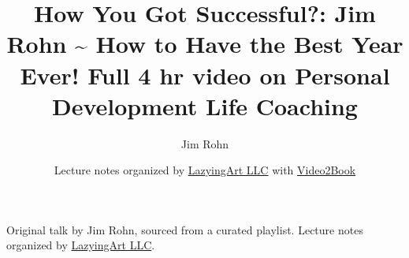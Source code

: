 \documentclass[11pt,oneside]{book}
\begin{document}
\frontmatter
\title{How You Got Successful?: Jim Rohn \textasciitilde{} How to Have the Best Year Ever! Full 4 hr video on Personal Development Life Coaching}
\author{Jim Rohn}
\date{Lecture notes organized by \href{https://lazying.art}{LazyingArt LLC} with \href{https://github.com/lachlanchen/Video2Book}{Video2Book}}
\maketitle
\begin{center}
\small Original talk by Jim Rohn, sourced from a curated playlist. Lecture notes organized by \href{https://lazying.art}{LazyingArt LLC}.
\end{center}
\clearpage
\mainmatter

\end{document}
